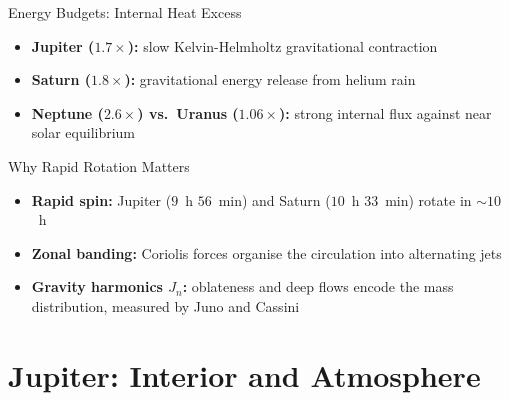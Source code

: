 \documentclass[aspectratio=169, 11pt]{beamer}
\begin{document}
\begin{frame}{Energy Budgets: Internal Heat Excess}
  \begin{itemize}\setlength\itemsep{4pt}
    \item \textbf{Jupiter ($1.7\times$):} slow Kelvin-Helmholtz gravitational contraction
    \item \textbf{Saturn ($1.8\times$):} gravitational energy release from helium rain
    \item \textbf{Neptune ($2.6\times$) vs.\ Uranus ($1.06\times$):} strong internal flux against near solar equilibrium
  \end{itemize}
  \vskip8pt
\end{frame}

\begin{frame}{Why Rapid Rotation Matters}
  \begin{itemize}\setlength\itemsep{4pt}
    \item \textbf{Rapid spin:} Jupiter ($9$~h $56$~min) and Saturn ($10$~h $33$~min) rotate in $\sim 10$~h
    \item \textbf{Zonal banding:} Coriolis forces organise the circulation into alternating jets
    \item \textbf{Gravity harmonics $J_n$:} oblateness and deep flows encode the mass distribution, measured by Juno and Cassini
  \end{itemize}
\end{frame}


\section{Jupiter: Interior and Atmosphere}


\begin{frame}
\end{frame}
\end{document}
